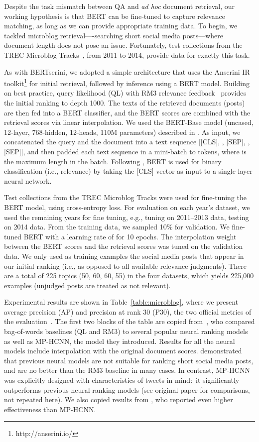 \documentclass[11pt,a4paper]{article}
\begin{document}
Despite the task mismatch between QA and {\it ad hoc} document retrieval, our working hypothesis is that BERT can be fine-tuned to capture relevance matching, as long as we can provide appropriate training data.
To begin, we tackled microblog retrieval----searching short social media posts---where document length does not pose an issue.
Fortunately, test collections from the TREC Microblog Tracks~\cite{Lin_etal_TREC2014}, from 2011 to 2014, provide data for exactly this task.

As with BERTserini, we adopted a simple architecture that uses the Anserini IR toolkit\footnote{http://anserini.io/} for initial retrieval, followed by inference using a BERT model.
Building on best practice, query likelihood (QL) with RM3 relevance feedback~\cite{Abdul-Jaleel04} provides the initial ranking to depth 1000.
The texts of the retrieved documents (posts) are then fed into a BERT classifier, and the BERT scores are combined with the retrieval scores via linear interpolation.
We used the BERT-Base model (uncased, 12-layer, 768-hidden, 12-heads, 110M parameters) described in \citet{devlin2018bert}.
As input, we concatenated the query  and the document  into a text sequence [[CLS], , [SEP], , [SEP]], and then padded each text sequence in a mini-batch to  tokens, where  is the maximum length in the batch.
Following \citet{nogueira2019passage}, BERT is used for binary classification (i.e., relevance) by taking the [CLS] vector as input to a single layer neural network.

Test collections from the TREC Microblog Tracks were used for fine-tuning the BERT model, using cross-entropy loss.
For evaluation on each year's dataset, we used the remaining years for fine tuning, e.g., tuning on 2011--2013 data, testing on 2014 data.
From the training data, we sampled 10\% for validation.
We fine-tuned BERT with a learning rate of  for 10 epochs.
The interpolation weight between the BERT scores and the retrieval scores was tuned on the validation data.
We only used as training examples the social media posts that appear in our initial ranking (i.e., as opposed to all available relevance judgments).
There are a total of 225 topics (50, 60, 60, 55) in the four datasets, which yields 225,000 examples (unjudged posts are treated as not relevant).

Experimental results are shown in Table~\ref{table:microblog}, where we present average precision (AP) and precision at rank 30 (P30), the two official metrics of the evaluation~\cite{Ounis_etal_TREC2011}.
The first two blocks of the table are copied from~\citet{rao2019multi}, who compared bag-of-words baselines (QL and RM3) to several popular neural ranking models as well as MP-HCNN, the model they introduced.
Results for all the neural models include interpolation with the original document scores.
\citet{rao2019multi} demonstrated that previous neural models are not suitable for ranking short social media posts, and are no better than the RM3 baseline in many cases.
In contrast, MP-HCNN was explicitly designed with characteristics of tweets in mind:\ it significantly outperforms previous neural ranking models (see original paper for comparisons, not repeated here).
We also copied results from \citet{Shi_etal_arXiv2018}, who reported even higher effectiveness than MP-HCNN.
\end{document}
